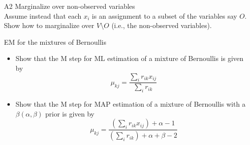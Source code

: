 \documentclass[a4paper,twoside=false,abstract=false,numbers=noenddot,
titlepage=false,headings=small,parskip=half,version=last]{scrartcl}
\begin{document}
\begin{exercise}{A2} Marginalize over non-observed variables \\
    Assume instead that each $x_i$ is an assignment to a subset of the
    variables say $O$.
    Show how to marginalize over $V\setminus O$ (i.e., the non-observed
    variables).
\end{exercise}
\begin{solution}

\end{solution}

\begin{exercise}{11.3} EM for the mixtures of Bernoullis\\ 
    \begin{itemize}
        \item Show that the M step for ML estimation of a mixture of Bernoullis
            is given by
            \begin{equation}
                \label{eq:EM_ML_Ber}
                \mu_{kj} = 
                \frac
                {
                    \sum_i{
                        r_{ik}x_{ij}
                    }
                }
                {
                \sum_i{
                    r_{ik}
                }
            } 
            \end{equation}
        \item Show that the M step for MAP estimation of a mixture of
        Bernoullis with a $\beta(\alpha,\beta)$ prior is given by
            \begin{equation}
                \label{eq:EM_MAP_Ber}
                \mu_{kj} = 
                \frac
                {
                    (\sum_i{
                        r_{ik}x_{ij}
                    }) + \alpha - 1
                }
                {
                    (\sum_i{
                        r_{ik}
                    }) + \alpha + \beta - 2
                }
            \end{equation}
    \end{itemize}
\end{exercise}
\end{document}
